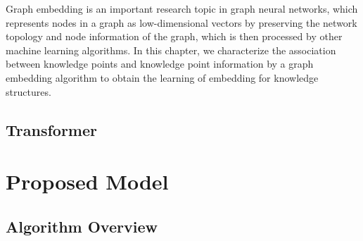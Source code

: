 Graph embedding is an important research topic in graph neural networks, which represents nodes in a graph as low-dimensional vectors by preserving the network topology and node information of the graph, which is then processed by other machine learning algorithms. In this chapter, we characterize the association between knowledge points and knowledge point information by a graph embedding algorithm to obtain the learning of embedding for knowledge structures.

\subsection{Transformer}


\section{Proposed Model}

\subsection{Algorithm Overview}


